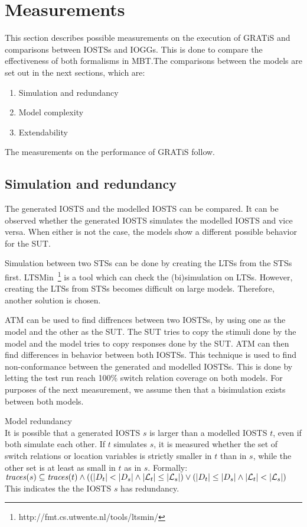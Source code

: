 \section{Measurements}\label{sec:measurements}
This section describes possible measurements on the execution of GRATiS and comparisons between IOSTSs and IOGGs. This is done to compare the effectiveness of both formalisms in MBT.The comparisons between the models are set out in the next sections, which are:
\begin{enumerate}
\item Simulation and redundancy
\item Model complexity
\item Extendability
\end{enumerate}
The measurements on the performance of GRATiS follow.

\subsection{Simulation and redundancy}
The generated IOSTS and the modelled IOSTS can be compared. It can be observed whether the generated IOSTS simulates the modelled IOSTS and vice versa. When either is not the case, the models show a different possible behavior for the SUT.

Simulation between two STSs can be done by creating the LTSs from the STSs first. LTSMin~\footnote{http://fmt.cs.utwente.nl/tools/ltsmin/} is a tool which can check the (bi)simulation on LTSs. However, creating the LTSs from STSs becomes difficult on large models. Therefore, another solution is chosen.

ATM can be used to find diffrences between two IOSTSs, by using one as the model and the other as the SUT. The SUT tries to copy the stimuli done by the model and the model tries to copy responses done by the SUT. ATM can then find differences in behavior between both IOSTSs. This technique is used to find non-conformance between the generated and modelled IOSTSs. This is done by letting the test run reach 100\% switch relation coverage on both models. For purposes of the next measurement, we assume then that a bisimulation exists between both models.

\begin{definition}\label{def:redundancy} Model redundancy\\
It is possible that a generated IOSTS $s$ is larger than a modelled IOSTS $t$, even if both simulate each other. If $t$ simulates $s$, it is measured whether the set of switch relations or location variables is strictly smaller in $t$ than in $s$, while the other set is at least as small in $t$ as in $s$. Formally:
\vspace{5px} \\
$\mathit{traces}(s) \subseteq \mathit{traces}(t) \land ((|D_t| < |D_s| \land |\mathcal{L}_t| \leq |\mathcal{L}_s|) \lor (|D_t| \leq |D_s| \land |\mathcal{L}_t| < |\mathcal{L}_s|)$
\vspace{5px} \\
This indicates the the IOSTS $s$ has redundancy.
\end{definition}

